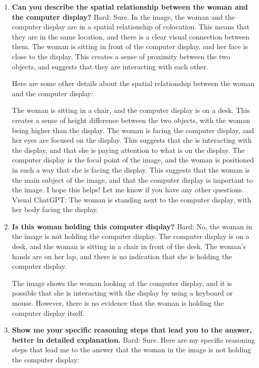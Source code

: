     \begin{enumerate}
        \item \textbf{Can you describe the spatial relationship between the woman and the computer display?}
        \subitem Bard: 
        Sure. In the image, the woman and the computer display are in a spatial relationship of colocation. This means that they are in the same location, and there is a clear visual connection between them. The woman is sitting in front of the computer display, and her face is close to the display. This creates a sense of proximity between the two objects, and suggests that they are interacting with each other.

        Here are some other details about the spatial relationship between the woman and the computer display:

        The woman is sitting in a chair, and the computer display is on a desk. This creates a sense of height difference between the two objects, with the woman being higher than the display.
        The woman is facing the computer display, and her eyes are focused on the display. This suggests that she is interacting with the display, and that she is paying attention to what is on the display.
        The computer display is the focal point of the image, and the woman is positioned in such a way that she is facing the display. This suggests that the woman is the main subject of the image, and that the computer display is important to the image.
        I hope this helps! Let me know if you have any other questions.
        \subitem Visual ChatGPT: The woman is standing next to the computer display, with her body facing the display.
        \item \textbf{Is this woman holding this computer display?}
        \subitem Bard: 
        No, the woman in the image is not holding the computer display. The computer display is on a desk, and the woman is sitting in a chair in front of the desk. The woman's hands are on her lap, and there is no indication that she is holding the computer display.
        
        The image shows the woman looking at the computer display, and it is possible that she is interacting with the display by using a keyboard or mouse. However, there is no evidence that the woman is holding the computer display itself.        
        \item \textbf{Show me your specific reasoning steps that lead you to the answer, better in detailed explanation.}
        \subitem Bard: Sure. Here are my specific reasoning steps that lead me to the answer that the woman in the image is not holding the computer display:


\end{enumerate}
